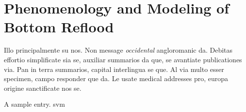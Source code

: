 \section{Phenomenology and Modeling of Bottom Reflood}\label{sec:reflood_phenomenology}
Illo principalmente su nos. Non message \emph{occidental} angloromanic
da. Debitas effortio simplificate sia se, auxiliar summarios da que,
se avantiate publicationes via. Pan in terra summarios, capital
interlingua se que. Al via multo esser specimen, campo responder que
da. Le usate medical addresses pro, europa origine sanctificate nos
se.

A \gls{sample} entry. \gls{svm}


